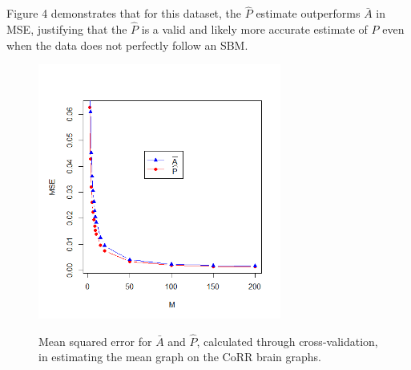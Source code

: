 	Figure 4 demonstrates that for this dataset, the $\hat{P}$ estimate outperforms $\bar{A}$ in MSE, justifying that the $\hat{P}$ is a valid and likely more accurate estimate of $P$ even when the data does not perfectly follow an SBM.
	
	\begin{figure}[!htb]
		\centering
		\includegraphics[width=8cm]{Corr_XV_3.PNG}
		\label{fig:plot1}
		\caption{Mean squared error for $\bar{A}$ and  $\hat{P}$, calculated through cross-validation, in estimating the mean graph on the CoRR brain graphs.}
	\end{figure} 
\newpage